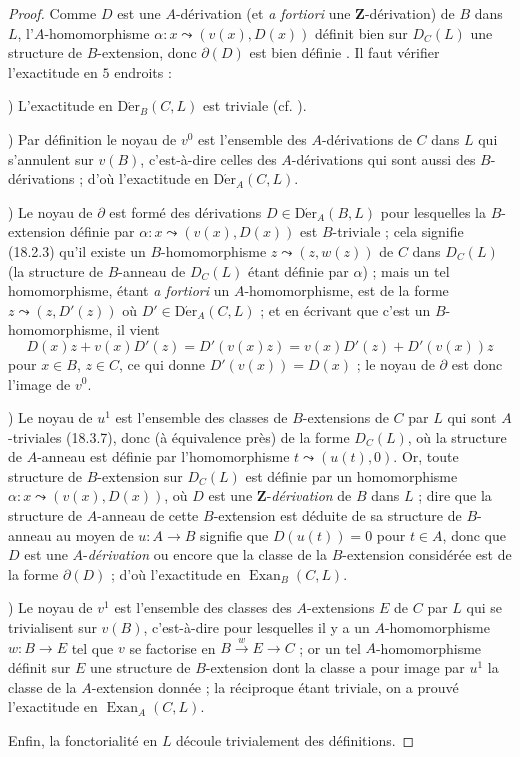 \begin{proof}
Comme $D$ est une $A$-dérivation (et \emph{a fortiori} une
$\mathbf{Z}$-dérivation) de $B$ dans $L$, l'$A$-homomorphisme
$\alpha:x\leadsto(v(x),D(x))$ définit bien sur $D_C(L)$ une structure de
$B$-extension, donc $\partial(D)$ est bien définie . Il
faut vérifier l'exactitude en $5$ endroits :

\medskip
{})\enspace
L'exactitude en $\operatorname{D\acute{e}r}_B(C,L)$ est triviale (cf.
).

\medskip
{})\enspace
Par définition  le noyau de $v^0$ est l'ensemble des
$A$-dérivations de $C$ dans $L$ qui s'annulent sur $v(B)$, c'est-à-dire
celles des $A$-dérivations qui sont aussi des $B$-dérivations
 ; d'où l'exactitude en $\operatorname{D\acute{e}r}_A(C,L)$.

\medskip
{})\enspace
Le noyau de $\partial$ est formé des dérivations
$D\in\operatorname{D\acute{e}r}_A(B,L)$ pour lesquelles la $B$-extension définie par
$\alpha:x\leadsto(v(x),D(x))$ est $B$-triviale ; cela signifie (18.2.3) qu'il
existe un $B$-homomorphisme $z\leadsto(z,w(z))$ de $C$ dans $D_C(L)$ (la
structure de $B$-anneau de $D_C(L)$ étant définie par $\alpha$) ; mais un tel
homomorphisme, étant \emph{a fortiori} un $A$-homomorphisme, est de la forme
$z\leadsto(z,D'(z))$ où $D'\in\operatorname{D\acute{e}r}_A(C,L)$
 ; et en écrivant que c'est un $B$-homomorphisme, il vient
\[
  D(x)z+v(x)D'(z)=D'(v(x)z)=v(x)D'(z)+D'(v(x))z
\]
pour $x\in B$, $z\in C$, ce qui donne $D'(v(x))=D(x)$ ; le noyau de
$\partial$ est donc l'image de $v^0$.

\medskip
{})\enspace
Le noyau de $u^1$ est l'ensemble des classes de $B$-extensions de $C$ par
$L$ qui sont $A$-triviales (18.3.7), donc (à équivalence près) de la forme
$D_C(L)$, où la structure de $A$-anneau est définie par l'homomorphisme
$t\leadsto(u(t),0)$. Or, toute structure de $B$-extension sur $D_C(L)$ est
définie par un homomorphisme $\alpha:x\leadsto(v(x),D(x))$, où $D$ est une
$\mathbf{Z}$-\emph{dérivation} de $B$ dans $L$  ; dire que la
structure de $A$-anneau de cette $B$-extension est déduite de sa structure de
$B$-anneau au moyen de $u:A\to B$ signifie que $D(u(t))=0$ pour $t\in A$,
donc que $D$ est une $A$-\emph{dérivation} ou encore que la classe de la $B$-extension
considérée est de la forme $\partial(D)$ ; d'où l'exactitude en
$\operatorname{Exan}_B(C,L)$.

\medskip
{})\enspace
Le noyau de $v^1$ est l'ensemble des classes des $A$-extensions $E$ de $C$
par $L$ qui se trivialisent sur $v(B)$, c'est-à-dire pour lesquelles il y a un
$A$-homomorphisme $w:B\to E$ tel que $v$ se factorise en
$B\xrightarrow{w}E\to C$ ; or un tel $A$-homomorphisme définit sur $E$ une
structure de $B$-extension dont la classe a pour image par $u^1$ la classe de
la $A$-extension donnée ; la réciproque étant triviale, on a prouvé
l'exactitude en $\operatorname{Exan}_A(C,L)$.

Enfin, la fonctorialité en $L$ découle trivialement des définitions.
\end{proof}

